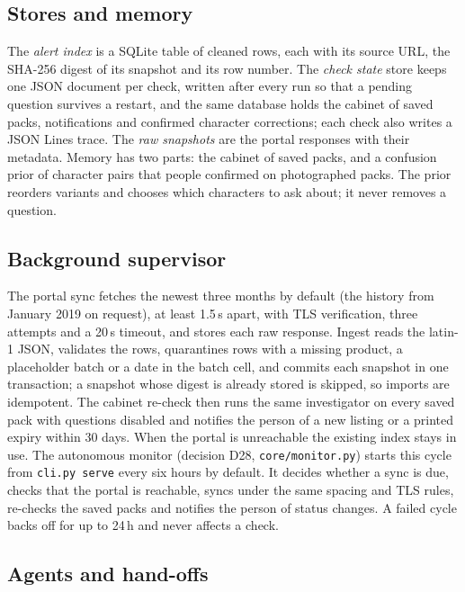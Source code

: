 \subsection{Stores and memory}

The \emph{alert index} is a SQLite table of cleaned rows, each with its source URL, the SHA-256
digest of its snapshot and its row number. The \emph{check state} store keeps one JSON document per
check, written after every run so that a pending question survives a restart, and the same database
holds the cabinet of saved packs, notifications and confirmed character corrections; each check also
writes a JSON Lines trace. The \emph{raw snapshots} are the portal responses with their metadata.
Memory has two parts: the cabinet of saved packs, and a confusion prior of character pairs that
people confirmed on photographed packs. The prior reorders variants and chooses which characters to
ask about; it never removes a question.

\subsection{Background supervisor}

The portal sync fetches the newest three months by default (the history from January 2019 on
request), at least 1.5\,s apart, with TLS verification, three attempts and a 20\,s timeout, and
stores each raw response. Ingest reads the latin-1 JSON, validates the rows, quarantines rows with a
missing product, a placeholder batch or a date in the batch cell, and commits each snapshot in one
transaction; a snapshot whose digest is already stored is skipped, so imports are idempotent. The
cabinet re-check then runs the same investigator on every saved pack with questions disabled and
notifies the person of a new listing or a printed expiry within 30 days. When the portal is
unreachable the existing index stays in use. The autonomous monitor (decision D28,
\texttt{core/monitor.py}) starts this cycle from \texttt{cli.py serve} every six hours by default. It decides whether a
sync is due, checks that the portal is reachable, syncs under the same spacing and TLS rules, re-checks the saved packs
and notifies the person of status changes. A failed cycle backs off for up to 24\,h and never affects a check.

\subsection{Agents and hand-offs}
\label{sec:design-agents-handoffs}

